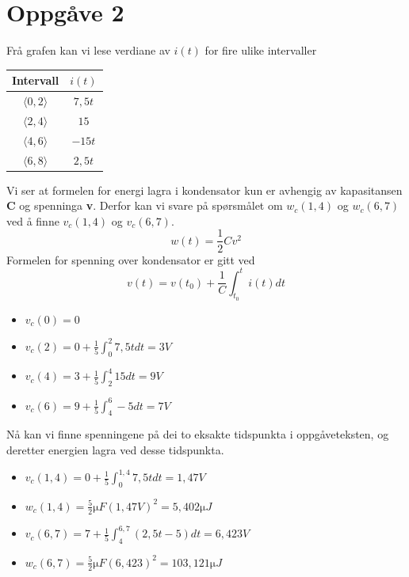 \documentclass[12pt,a4paper]{article}
\begin{document}
  \section{Oppgåve 2}
    Frå grafen kan vi lese verdiane av $i(t)$ for fire ulike intervaller
    \begin{center}
      \begin{tabular}{ |c|c| }
        \hline
        Intervall & $i(t)$ \\
        \hline
        $\langle 0, 2 \rangle$ & $7,5t$ \\
        \hline
        $\langle 2, 4 \rangle$ & $15$ \\
        \hline
        $\langle 4, 6 \rangle$ & $-15t$ \\
        \hline
        $\langle 6, 8 \rangle$ & $2,5t$ \\
        \hline
      \end{tabular}
    \end{center}
    Vi ser at formelen for energi lagra i kondensator kun er avhengig av
    kapasitansen \textbf{C} og spenninga \textbf{v}. Derfor kan vi svare på spørsmålet
    om $w_c(1,4)$ og $w_c(6,7)$ ved å finne $v_c(1,4)$ og $v_c(6,7)$.
    \begin{equation}
      w(t) = \frac{1}{2}Cv^2
    \end{equation}
    Formelen for spenning over kondensator er gitt ved
    \begin{equation}
      v(t) = v(t_0) + \frac{1}{C}\int_{t_0}^{t}i(t)dt
    \end{equation}
    \begin{itemize}
      \item $v_c(0) = 0$
      \item $v_c(2) = 0 + \frac{1}{5}\int_0^2 7,5tdt = 3V$
      \item $v_c(4) = 3 + \frac{1}{5}\int_2^4 15dt = 9V$
      \item $v_c(6) = 9 + \frac{1}{5}\int_4^6 -5dt = 7V$
    \end{itemize}
    Nå kan vi finne spenningene på dei to eksakte tidspunkta i oppgåveteksten, og
    deretter energien lagra ved desse tidspunkta.
    \begin{itemize}
      \item $v_c(1,4) = 0 + \frac{1}{5}\int_0^{1,4} 7,5tdt = 1,47V$
      \item $w_c(1,4) = \frac{5}{2}\si{\micro F}(1,47V)^2 = 5,402\si{\micro J}$
      \item $v_c(6,7) = 7 + \frac{1}{5}\int_4^{6,7} (2,5t - 5)dt = 6,423V$
      \item $w_c(6,7) = \frac{5}{2}\si{\micro F}(6,423)^2 = 103,121\si{\micro J}$
    \end{itemize}
\end{document}
